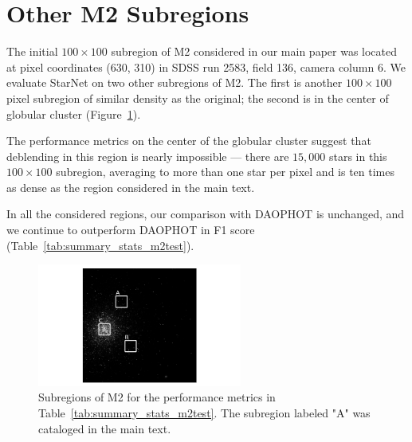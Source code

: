 \section{Other M2 Subregions}
\label{sec:test_m2}

The initial $100\times100$ subregion of M2 considered in our main paper was located at pixel coordinates (630, 310) in SDSS run 2583, field 136, camera column 6. 
We evaluate StarNet on two other subregions of M2.
The first is another $100\times100$ pixel subregion of similar density as the original;
the second is in the center of globular cluster
(Figure~\ref{fig:m2_test_regions}).

The performance metrics on the center of the globular cluster 
suggest that deblending in this region is nearly impossible --- there are $15,000$ stars in this $100\times100$ subregion, 
averaging to more than one star per pixel
and is 
ten times as dense as the region considered in the main text.

In all the considered regions, our comparison with DAOPHOT is unchanged, and we continue to outperform DAOPHOT in F1 score (Table~\ref{tab:summary_stats_m2test}). 

\begin{figure}[tb]
    \centering
    \includegraphics[width=0.6\textwidth]{figures/m2_results/test_images.png}
    \caption{Subregions of M2 for the performance metrics in Table~\ref{tab:summary_stats_m2test}. The subregion labeled "A" was cataloged in the main text. 
}
    \label{fig:m2_test_regions}
\end{figure}



